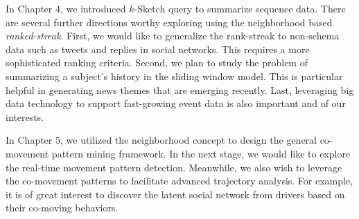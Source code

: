In Chapter 4, we introduced $k$-Sketch query
to summarize sequence data. There are several further directions
worthy exploring using the neighborhood based \emph{ranked-streak}. First,
we would like to generalize the rank-streak to non-schema data 
such as tweets and replies in social networks. 
This requires a more sophisticated ranking criteria.
Second, we plan to study the problem of summarizing a subject's history
in the sliding window model. This is particular helpful in generating news themes that
are emerging recently. Last, leveraging big data technology 
to support fast-growing event data is also important and of our interests.
%


In Chapter 5, we utilized the neighborhood concept to
design the general co-movement pattern mining framework.
In the next stage, we would like to explore the real-time 
movement pattern detection. Meanwhile, we also wish
to leverage the co-movement patterns to facilitate advanced
trajectory analysis. For example, it is of great interest
to discover the latent social network from drivers based 
on their co-moving behaviors.  


%
%


